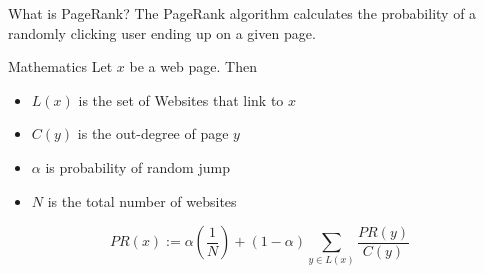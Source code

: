 \begin{frame}{What is PageRank?}
    The PageRank algorithm calculates the probability of a randomly
    clicking user ending up on a given page.
\end{frame}




\begin{frame}{Mathematics}
    Let $x$ be a web page. Then
    \begin{itemize}
        \item $L(x)$ is the set of Websites that link to $x$
        \item $C(y)$ is the out-degree of page $y$
        \item $\alpha$ is probability of random jump
        \item $N$ is the total number of websites
    \end{itemize}

    \[\displaystyle PR(x) := \alpha \left ( \frac{1}{N} \right ) + (1-\alpha) \sum_{y\in L(x)} \frac{PR(y)}{C(y)}\]
\end{frame}

